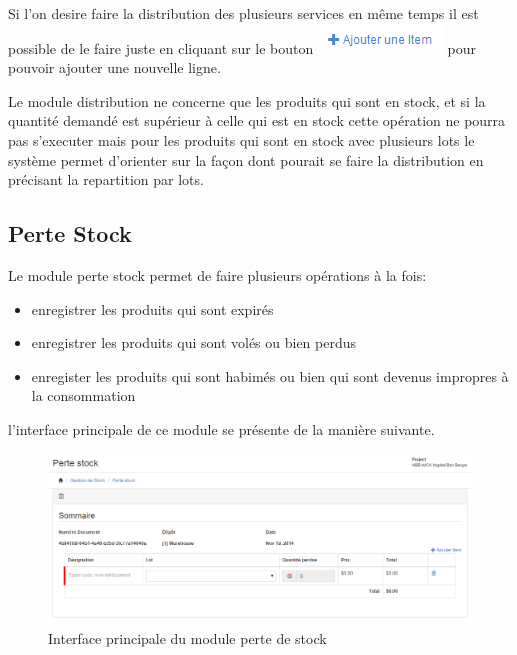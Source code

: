 \documentclass[12pt,a4paper]{report}
\begin{document}
Si l'on desire faire la distribution des plusieurs services en même temps il est possible de le faire juste en cliquant sur le bouton \includegraphics[scale=0.7]{pic/AjouterItem.png} pour pouvoir ajouter une nouvelle ligne.

Le module distribution ne concerne que les produits qui sont en stock, et si la quantité demandé est supérieur à celle qui est en stock cette opération ne pourra pas s'executer mais pour les produits qui sont en stock avec plusieurs lots le système permet d'orienter sur la façon dont pourait se faire la distribution en précisant la repartition par lots.

\newpage
\subsection{Perte Stock}
Le module perte stock permet de faire plusieurs opérations à la fois:

\begin{itemize}
\item enregistrer les produits qui sont expirés
\item enregistrer les produits qui sont volés ou bien perdus
\item enregister les produits qui sont habimés ou bien qui sont devenus impropres à la consommation
\end{itemize}

l'interface principale de ce module se présente de la manière suivante.

\begin{figure}[h]
\begin{center}
\includegraphics[width=14cm]{pic/PerteStock.png}
\end{center}
\caption{Interface principale du module perte de stock}
\label{Interface principale du module perte de stock}
\end{figure}
\end{document}
